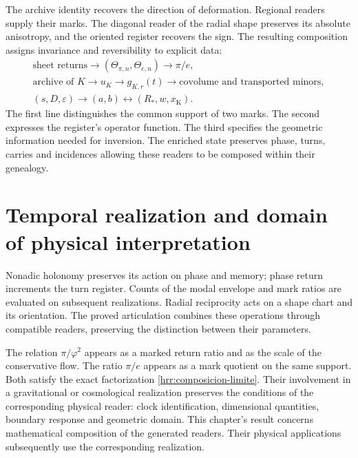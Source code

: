 The archive identity recovers the direction of deformation. Regional readers supply their marks. The diagonal reader of the radial shape preserves its absolute anisotropy, and the oriented register recovers the sign. The resulting composition assigns invariance and reversibility to explicit data:
\[
 \begin{gathered}
 \text{sheet returns}
 \longrightarrow(\Theta_{\pi,n},\Theta_{e,n})
 \longrightarrow\pi/e,\\
 \text{archive of }K\longrightarrow u_K
 \longrightarrow g_{K,r}(t)
 \longrightarrow\text{covolume and transported minors},\\
 (s,D,\varepsilon)\longrightarrow(a,b)
 \longleftrightarrow(R_*,w,x_{\mathrm K}).
 \end{gathered}
\]
The first line distinguishes the common support of two marks. The second expresses the register's operator function. The third specifies the geometric information needed for inversion. The enriched state preserves phase, turns, carries and incidences allowing these readers to be composed within their genealogy.

\section{Temporal realization and domain of physical interpretation}

Nonadic holonomy preserves its action on phase and memory; phase return increments the turn register. Counts of the modal envelope and mark ratios are evaluated on subsequent realizations. Radial reciprocity acts on a shape chart and its orientation. The proved articulation combines these operations through compatible readers, preserving the distinction between their parameters.

The relation \(\pi/\varphi^2\) appears as a marked return ratio and as the scale of the conservative flow. The ratio \(\pi/e\) appears as a mark quotient on the same support. Both satisfy the exact factorization \eqref{hrr:composicion-limite}. Their involvement in a gravitational or cosmological realization preserves the conditions of the corresponding physical reader: clock identification, dimensional quantities, boundary response and geometric domain. This chapter's result concerns mathematical composition of the generated readers. Their physical applications subsequently use the corresponding realization.
